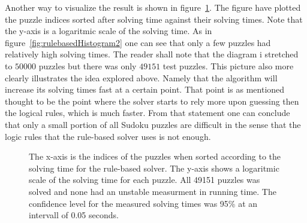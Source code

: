 \documentclass[a4paper,11pt]{kth-mag}
\begin{document}
\FloatBarrier
Another way to visualize the result is shown in figure~\ref{fig:rulebasedIndices}.
The figure have plotted the puzzle indices sorted after solving time against their solving times.
Note that the y-axis is a logaritmic scale of the solving time.
As in figure~\ref{fig:rulebasedHistogram2} one can see that only a few puzzles had relatively high solving times.
The reader shall note that the diagram i stretched to $50000$ puzzles but there was only $49151$ test puzzles.   
This picture also more clearly illustrates the idea explored above.
Namely that the algorithm will increase its solving times fast at a certain point.
That point is as mentioned thought to be the point where the solver starts to rely more upon guessing then the logical rules, which is much faster.
From that statement one can conclude that only a small portion of all Sudoku puzzles are difficult in the sense that the logic rules that the rule-based solver uses is not enough.
\\
\begin{figure}[here] 
\noindent{}
\vspace{-25pt}
\caption{The x-axis is the indices of the puzzles when sorted according to the solving time for the rule-based solver. The y-axis shows a logaritmic scale of the solving time for each puzzle. All 49151 puzzles was solved and none had an unstable measurment in running time. The confidence level for the measured solving times was 95\% at an intervall of 0.05 seconds.}
\label{fig:rulebasedIndices}
\end{figure}

\FloatBarrier
\end{document}
